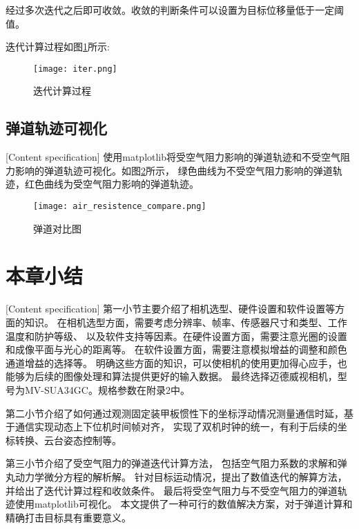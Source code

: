 经过多次迭代之后即可收敛。收敛的判断条件可以设置为目标位移量低于一定阈值。

迭代计算过程如图\ref{迭代计算过程}所示:

\begin{figure}[H]
    \centering
    \texttt{[image: iter.png]} 
    \caption{迭代计算过程} 
    \label{迭代计算过程}
\end{figure}

\subsection{弹道轨迹可视化}[Content specification]
使用matplotlib将受空气阻力影响的弹道轨迹和不受空气阻力影响的弹道轨迹可视化。如图\ref{弹道对比}所示，
绿色曲线为不受空气阻力影响的弹道轨迹，红色曲线为受空气阻力影响的弹道轨迹。
\begin{figure}[H]
    \centering
    \texttt{[image: air\_resistence\_compare.png]} 
    \caption{弹道对比图} 
    \label{弹道对比}
\end{figure}






\section{本章小结}[Content specification]
第一小节主要介绍了相机选型、硬件设置和软件设置等方面的知识。
在相机选型方面，需要考虑分辨率、帧率、传感器尺寸和类型、工作温度和防护等级、
以及软件支持等因素。在硬件设置方面，需要注意光圈的设置和成像平面与光心的距离等。
在软件设置方面，需要注意模拟增益的调整和颜色通道增益的选择等。
明确这些方面的知识，可以使相机的使用更加得心应手，也能够为后续的图像处理和算法提供更好的输入数据。
最终选择迈德威视相机，型号为MV-SUA34GC。规格参数在附录2中。

\par
第二小节介绍了如何通过观测固定装甲板惯性下的坐标浮动情况测量通信时延，基于通信实现动态上下位机时间帧对齐，
实现了双机时钟的统一，有利于后续的坐标转换、云台姿态控制等。

\par
第三小节介绍了受空气阻力的弹道迭代计算方法，
包括空气阻力系数的求解和弹丸动力学微分方程的解析解。
针对目标运动情况，提出了数值迭代的解算方法，并给出了迭代计算过程和收敛条件。
最后将受空气阻力与不受空气阻力的弹道轨迹使用matplotlib可视化。
本文提供了一种可行的数值解决方案，对于弹道计算和精确打击目标具有重要意义。